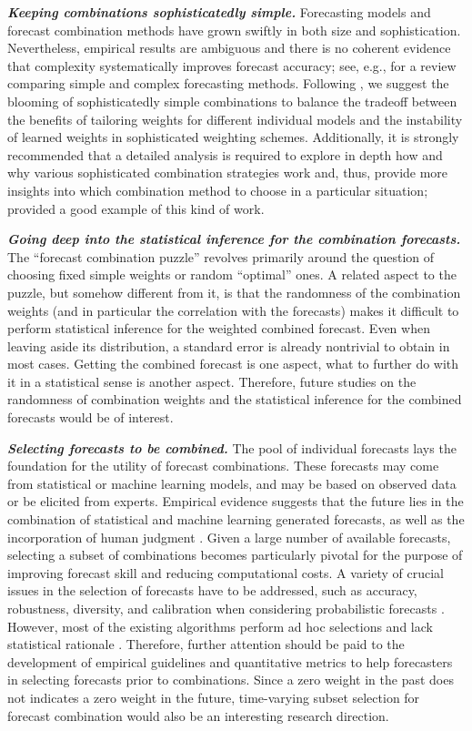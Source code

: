 \documentclass[a4paper,11pt]{article}
\begin{document}
\textbf{\textit{Keeping combinations sophisticatedly simple.}} Forecasting models and forecast combination methods have grown swiftly in both size and sophistication. Nevertheless, empirical results are ambiguous and there is no coherent evidence that complexity systematically improves forecast accuracy; see, e.g., \citet{Green2015-mi} for a review comparing simple and complex forecasting methods. Following \citet{Zellner2001-si}, we suggest the blooming of sophisticatedly simple combinations to balance the tradeoff between the benefits of tailoring weights for different individual models and the instability of learned weights in sophisticated weighting schemes. Additionally, it is strongly recommended that a detailed analysis is required to explore in depth how and why various sophisticated combination strategies work and, thus, provide more insights into which combination method to choose in a particular situation; \citet{Petropoulos2018-fw} provided a good example of this kind of work.

\textbf{\textit{Going deep into the statistical inference for the combination forecasts.}} The ``forecast combination puzzle'' revolves primarily around the question of choosing fixed simple weights or random ``optimal'' ones. A related aspect to the puzzle, but somehow different from it, is that the randomness of the combination weights (and in particular the correlation with the forecasts) makes it difficult to perform statistical inference for the weighted combined forecast. Even when leaving aside its distribution, a standard error is already nontrivial to obtain in most cases. Getting the combined forecast is one aspect, what to further do with it in a statistical sense is another aspect. Therefore, future studies on the randomness of combination weights and the statistical inference for the combined forecasts would be of interest.

\textbf{\textit{Selecting forecasts to be combined.}} The pool of individual forecasts lays the foundation for the utility of forecast combinations. These forecasts may come from statistical or machine learning models, and may be based on observed data or be elicited from experts. Empirical evidence suggests that the future lies in the combination of statistical and machine learning generated forecasts, as well as the incorporation of human judgment \citep{Petropoulos2018-ad,Makridakis2020-hu,Petropoulos2021-ft}. Given a large number of available forecasts, selecting a subset of combinations becomes particularly pivotal for the purpose of improving forecast skill and reducing computational costs. A variety of crucial issues in the selection of forecasts have to be addressed, such as accuracy, robustness, diversity, and calibration when considering probabilistic forecasts \citep{Lichtendahl2020-ut,wang2022another}. However, most of the existing algorithms perform ad hoc selections and lack statistical rationale \citep{Kourentzes2019-na}. Therefore, further attention should be paid to the development of empirical guidelines and quantitative metrics to help forecasters in selecting forecasts prior to combinations. Since a zero weight in the past does not indicates a zero weight in the future, time-varying subset selection for forecast combination would also be an interesting research direction.
\end{document}
